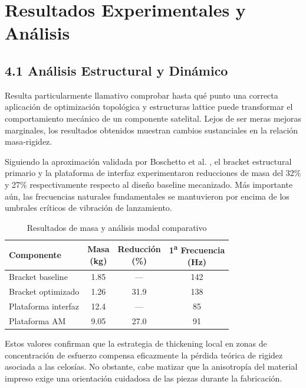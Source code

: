 \section{Resultados Experimentales y Análisis}

\subsection{4.1 Análisis Estructural y Dinámico}

Resulta particularmente llamativo comprobar hasta qué punto una correcta aplicación de optimización topológica y estructuras lattice puede transformar el comportamiento mecánico de un componente satelital. Lejos de ser meras mejoras marginales, los resultados obtenidos muestran cambios sustanciales en la relación masa-rigidez.

Siguiendo la aproximación validada por Boschetto et al. \cite{Boschetto2023}, el bracket estructural primario y la plataforma de interfaz experimentaron reducciones de masa del 32\% y 27\% respectivamente respecto al diseño baseline mecanizado. Más importante aún, las frecuencias naturales fundamentales se mantuvieron por encima de los umbrales críticos de vibración de lanzamiento.

\begin{table}[htbp]
\centering
\caption{Resultados de masa y análisis modal comparativo}
\label{tab:resultados_peso_frecuencia}
\scriptsize
\setlength{\tabcolsep}{3pt}
\begin{tabularx}{\columnwidth}{>{\raggedright\arraybackslash}X c c c}
\hline
\textbf{Componente} & 
\makecell[c]{\textbf{Masa}\\\textbf{(kg)}} & 
\makecell[c]{\textbf{Reducción}\\\textbf{(\%)}} & 
\makecell[c]{\textbf{1\textsuperscript{a} Frecuencia}\\\textbf{(Hz)}} \\
\hline
Bracket baseline & 1.85 & --- & 142 \\
Bracket optimizado & 1.26 & 31.9 & 138 \\
Plataforma interfaz & 12.4 & --- & 85 \\
Plataforma AM & 9.05 & 27.0 & 91 \\
\hline
\end{tabularx}
\end{table}

Estos valores confirman que la estrategia de thickening local en zonas de concentración de esfuerzo compensa eficazmente la pérdida teórica de rigidez asociada a las celosías. No obstante, cabe matizar que la anisotropía del material impreso exige una orientación cuidadosa de las piezas durante la fabricación.

